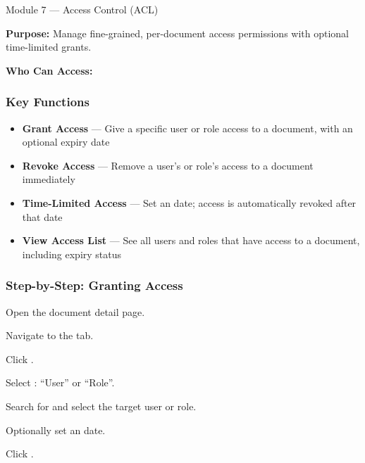 \begin{ugModule}{Module 7 --- Access Control (ACL)}

  \textbf{Purpose:}
  Manage fine-grained, per-document access permissions with
  optional time-limited grants.

  \textbf{Who Can Access:}
   

  \subsubsection*{Key Functions}
  \begin{itemize}[leftmargin=18pt]
    \item \textbf{Grant Access} --- Give a specific user or role
      access to a document, with an optional expiry date
    \item \textbf{Revoke Access} --- Remove a user's or role's
      access to a document immediately
    \item \textbf{Time-Limited Access} --- Set an
       date; access is automatically
      revoked after that date
    \item \textbf{View Access List} --- See all users and roles
      that have access to a document, including expiry status
  \end{itemize}

  \subsubsection*{Step-by-Step: Granting Access}
  \begin{ugSteps}
    \item Open the document detail page.
    \item Navigate to the  tab.
    \item Click .
    \item Select : ``User'' or ``Role''.
    \item Search for and select the target user or role.
    \item Optionally set an  date.
    \item Click .
  \end{ugSteps}


\end{ugModule}
